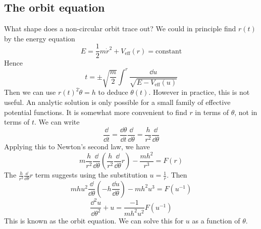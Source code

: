 \subsection{The orbit equation}
What shape does a non-circular orbit trace out?
We could in principle find \(r(t)\) by the energy equation
\[
	E = \frac{1}{2}m \dot r^2 + V_\text{eff}(r) = \text{constant}
\]
Hence
\[
	t = \pm \sqrt{\frac{m}{2}} \int^r \frac{\dd{u}}{\sqrt{E - V_\text{eff}(u)}}
\]
Then we can use \(r(t)^2\dot \theta = h\) to deduce \(\theta(t)\).
However in practice, this is not useful.
An analytic solution is only possible for a small family of effective potential functions.
It is somewhat more convenient to find \(r\) in terms of \(\theta\), not in terms of \(t\).
We can write
\[
	\frac{\dd}{\dd{t}} = \frac{\dd{\theta}}{\dd{t}} \frac{\dd}{\dd{\theta}} = \frac{h}{r^2} \frac{\dd}{\dd{\theta}}
\]
Applying this to Newton's second law, we have
\[
	m\frac{h}{r^2} \frac{\dd}{\dd{\theta}}\left( \frac{h}{r^2} \frac{\dd}{\dd{\theta}} r \right) - \frac{mh^2}{r^3} = F(r)
\]
The \(\frac{h}{r^2} \frac{\dd}{\dd{\theta}} r\) term suggests using the substitution \(u = \frac{1}{r}\).
Then
\[
	mhu^2 \frac{\dd}{\dd{\theta}}\left( -h\frac{\dd{u}}{\dd{\theta}} \right) - mh^2u^3 = F(u^{-1})
\]
\[
	\frac{\dd^2 u}{\dd{\theta}^2} + u = \frac{-1}{mh^2u^2}F(u^{-1})
\]
This is known as the orbit equation.
We can solve this for \(u\) as a function of \(\theta\).
